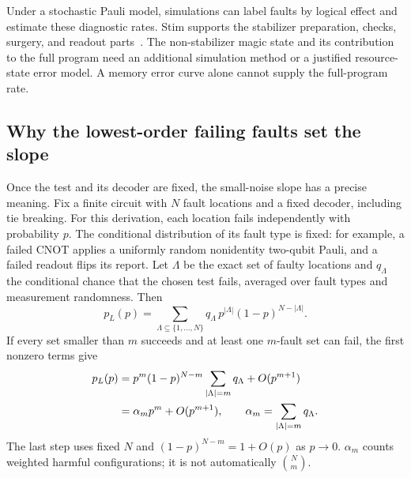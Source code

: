 \documentclass[11pt,a4paper]{article}
\begin{document}
Under a stochastic Pauli model, simulations can label faults by logical effect and estimate these diagnostic rates. Stim supports the stabilizer preparation, checks, surgery, and readout parts~\cite{stim}. The non-stabilizer magic state and its contribution to the full program need an additional simulation method or a justified resource-state error model. A memory error curve alone cannot supply the full-program rate.

\subsection{Why the lowest-order failing faults set the slope}
Once the test and its decoder are fixed, the small-noise slope has a precise meaning. Fix a finite circuit with $N$ fault locations and a fixed decoder, including tie breaking. For this derivation, each location fails independently with probability $p$. The conditional distribution of its fault type is fixed: for example, a failed CNOT applies a uniformly random nonidentity two-qubit Pauli, and a failed readout flips its report. Let $\Lambda$ be the exact set of faulty locations and $q_{\Lambda}$ the conditional chance that the chosen test fails, averaged over fault types and measurement randomness. Then
\begin{equation}\label{eq:exact}
p_L(p)=\sum_{\Lambda\subseteq\{1,\ldots,N\}}q_{\Lambda}\,p^{|\Lambda|}(1-p)^{N-|\Lambda|}.
\end{equation}
If every set smaller than $m$ succeeds and at least one $m$-fault set can fail, the first nonzero terms give
\begin{align}
p_L(p)&=p^m(1-p)^{N-m}\sum_{|\Lambda|=m}q_{\Lambda}+O(p^{m+1})\notag\\
&=\alpha_m p^m+O(p^{m+1}),\qquad \alpha_m=\sum_{|\Lambda|=m}q_{\Lambda}.\label{eq:scaling}
\end{align}
The last step uses fixed $N$ and $(1-p)^{N-m}=1+O(p)$ as $p\to0$. $\alpha_m$ counts weighted harmful configurations; it is not automatically $\binom Nm$.

\end{document}
